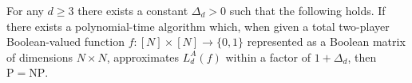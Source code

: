 \setcounter{theorem}{3}
\begin{theorem}
For any $d\ge3$ there exists a constant $\Delta_d>0$ such that the following holds. If there exists a polynomial-time algorithm which, when given a total two-player Boolean-valued function $f:[N]\times[N]\to\{0,1\}$ represented as a Boolean matrix of dimensions $N\times N$, approximates $L_d^A(f)$ within a factor of $1+\Delta_d$, then $\mathrm P=\mathrm{NP}$.
\end{theorem}
